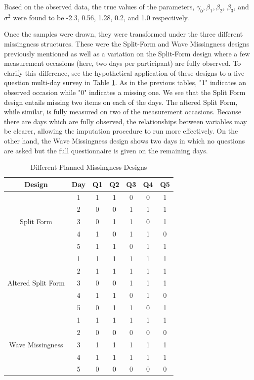 \documentclass{svjour3}\usepackage[]{graphicx}\usepackage[]{color}
\begin{document}
Based on the observed data, the true values of the parameters, $\gamma_0, \beta_1, \beta_2$, $\beta_3$, and $\sigma^2$ were found to be -2.3, 0.56, 1.28, 0.2, and 1.0 respectively. \par
Once the samples were drawn, they were transformed under the three different missingness structures. These were the Split-Form and Wave Missingness designs previously mentioned as well as a variation on the Split-Form design where a few measurement occasions (here, two days per participant) are fully observed. To clarify this difference, see the hypothetical application of these designs to a five question multi-day survey in Table \ref{tab:table14}. As in the previous tables, "1" indicates an observed occasion while "0" indicates a missing one. We see that the Split Form design entails missing two items on each of the days. The altered Split Form, while similar, is fully measured on two of the measurement occasions. Because there are days which are fully observed, the relationships between variables may be clearer, allowing the imputation procedure to run more effectively. On the other hand, the Wave Missingness design shows two days in which no questions are asked but the full questionnaire is given on the remaining days. \par

\begin{table}[t!]
	\centering
	\caption{Different Planned Missingness Designs}
	\setlength{\tabcolsep}{0.45cm}
	\label{tab:table14}
	\hspace*{-1cm}
	\begin{tabular}{c|c|ccccc}
		\toprule
		Design & Day & Q1 & Q2 & Q3 & Q4 & Q5 \\
		\midrule
		\multirow{5}{*}{Split Form}
		& 1 & 1 & 1 & 0 & 0 & 1 \\
		& 2 & 0 & 0 & 1 & 1 & 1 \\
		& 3 & 0 & 1 & 1 & 0 & 1 \\
		& 4 & 1 & 0 & 1 & 1 & 0 \\
		& 5 & 1 & 1 & 0 & 1 & 1 \\
		\midrule
		\midrule
		\multirow{5}{*}{Altered Split Form}
		& 1 & 1 & 1 & 1 & 1 & 1 \\
		& 2 & 1 & 1 & 1 & 1 & 1 \\
		& 3 & 0 & 0 & 1 & 1 & 1 \\
		& 4 & 1 & 1 & 0 & 1 & 0 \\
		& 5 & 0 & 1 & 1 & 0 & 1 \\
		\midrule
		\midrule
		\multirow{5}{*}{Wave Missingness}
		& 1 & 1 & 1 & 1 & 1 & 1 \\
		& 2 & 0 & 0 & 0 & 0 & 0 \\
		& 3 & 1 & 1 & 1 & 1 & 1 \\
		& 4 & 1 & 1 & 1 & 1 & 1 \\
		& 5 & 0 & 0 & 0 & 0 & 0 \\
		\bottomrule
	\end{tabular}
	\hspace*{-1cm}	
\end{table}
\end{document}
